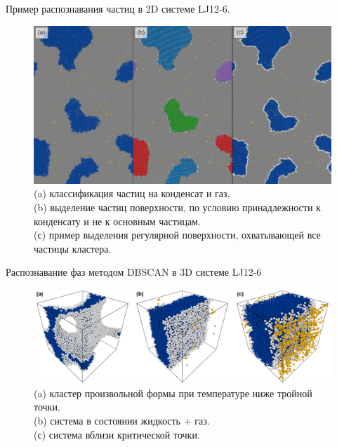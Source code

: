 \documentclass{beamer} %
\begin{document}
\begin{frame}{Пример распознавания частиц в 2D системе LJ12-6.}
  \footnotesize{

    \begin{figure}[!t]
      \centering
      \includegraphics[width=0.8\linewidth]{PRIMe-FIgure104.pdf}
      \caption{(a) классификация частиц на конденсат и газ. \\
        (b) выделение частиц поверхности, по условию принадлежности к конденсату и не к основным частицам. \\
        (с) пример выделения регулярной поверхности, охватывающей все частицы кластера.}
      \label{DBSCAN-Illustr}
    \end{figure}
  }
\end{frame}




\begin{frame}{Распознавание фаз методом DBSCAN в 3D системе LJ12-6}
  \footnotesize{
    \begin{figure}[!t]
      \centering
      \includegraphics[width=\linewidth]{PRIMe-Figure103.png}
      \caption{(a) кластер произвольной формы при температуре ниже тройной точки. \\
        (b) система в состоянии жидкость + газ. \\
        (с) система вблизи критической точки.}
      \label{D3_free_conf}
    \end{figure}
  }
\end{frame}
\end{document}

